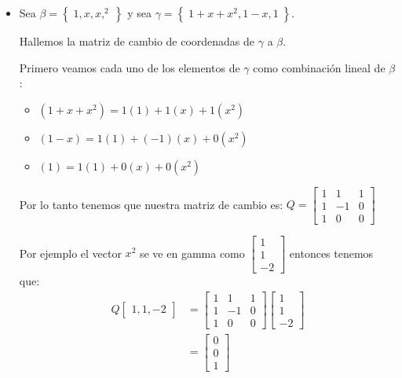 \documentclass[12pt, fleqn]{report}                             %
\theoremstyle{break}                                            %
\newcommand{\Set}[1]            {\left\{ \; #1 \; \right\}}     %
\newcommand{\bVector}[1]                                        %
        { \ensuremath{\begin{bmatrix}#1\end{bmatrix}} }             %
\begin{document}
                \begin{itemize}
                    \item 

                        Sea $\beta = \Set{1, x, x,^2}$ y sea $\gamma = \Set{1+x+x^2, 1-x, 1}$.

                        Hallemos la matriz de cambio de coordenadas de $\gamma$ a $\beta$.

                        Primero veamos cada uno de los elementos de $\gamma$ como combinación lineal de $\beta$:
                        \begin{itemize}
                            \item $(1+x+x^2) = 1(1) + 1(x) + 1(x^2)$
                            \item $(1-x) = 1(1) + (-1)(x) + 0(x^2)$
                            \item $(1) = 1(1) + 0(x) + 0(x^2)$
                        \end{itemize}

                        Por lo tanto tenemos que nuestra matriz de cambio es:
                        $Q = \bVector{1 & 1 & 1 \\ 1 & -1 & 0 \\ 1 & 0 & 0}$

                        Por ejemplo el vector $x^2$ se ve en gamma como $\bVector{1 \\ 1 \\ -2}$ entonces tenemos que:
                        \begin{align*}
                            Q\bVector{1, 1, -2}
                                &= \bVector{1 & 1 & 1 \\ 1 & -1 & 0 \\ 1 & 0 & 0} \bVector{1 \\ 1 \\ -2}        \\
                                &= \bVector{0 \\ 0 \\ 1}
                        \end{align*}
                \end{itemize}





\end{document}
